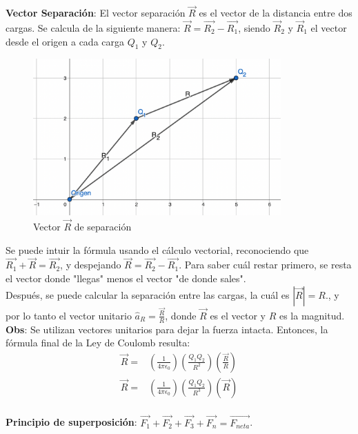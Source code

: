\documentclass[12pt, letterpaper]{report}
\begin{document}
\textbf{Vector Separación}: El vector separación $\vec{R}$ es el vector de la distancia entre dos cargas. Se calcula 
de la siguiente manera: $\vec{R} = \vec{R_2} - \vec{R_1}$, siendo $\vec{R}_2$ y $\vec{R}_1$ el vector desde el origen 
a cada carga $Q_1$ y $Q_2$.
\begin{figure}[H]
    \centering
    \includegraphics[height = 6cm]{SeparationVector.png}
    \caption{Vector $\vec{R}$ de separación}
\end{figure}
Se puede intuir la fórmula usando el cálculo vectorial, reconociendo que $\vec{R_1} + \vec{R} = \vec{R_2}$, y despejando 
$\vec{R} = \vec{R_2} - \vec{R_1}$. Para saber cuál restar primero, se resta el vector donde "llegas" menos el vector "de donde sales". \\

Después, se puede calcular la separación entre las cargas, la cuál es $|\vec{R}| = R$., y por lo tanto el vector unitario 
$\hat{a}_R = \frac{\vec{R}}{R}$, donde $\vec{R}$ es el vector y $R$ es la magnitud. \textbf{Obs}: Se utilizan vectores unitarios 
para dejar la fuerza intacta. Entonces, la fórmula final de la Ley de Coulomb resulta: 
\begin{align*}
\vec{R} =& (\frac{1}{4\pi \epsilon_0})(\frac{Q_1Q_2}{R^2})(\frac{\vec{R}}{R}) \\
\vec{R} =& (\frac{1}{4\pi \epsilon_0})(\frac{Q_1Q_2}{R^3})(\vec{R})
\end{align*}\\
\textbf{Principio de superposición}: 
$\vec{F_1} + \vec{F_2} + \vec{F_3} + \vec{F_n} = \vec{F_{neta}}$. 
\end{document}
